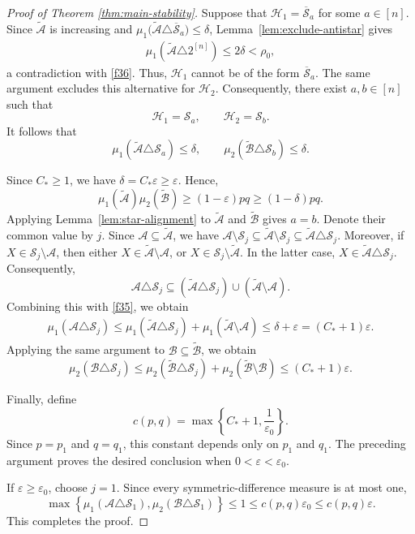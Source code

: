 \documentclass[11pt]{article}
\numberwithin{equation}{section}
\theoremstyle{definition}
\theoremstyle{remark}
\begin{document}
\begin{proof}[Proof of Theorem \ref{thm:main-stability}]
Suppose that
$
\mathcal H_1=\overline{\mathcal S}_a
$
for some $a\in[n]$. Since $\widetilde{\mathcal A}$ is increasing and $\mu_1\bigl(\widetilde{\mathcal A}\triangle
\overline{\mathcal S}_a\bigr)\leq \delta$,
Lemma~\ref{lem:exclude-antistar} gives
$$
\begin{aligned}
\mu_1(\widetilde{\mathcal A}\triangle2^{[n]})
\leq
2\delta<
\rho_0,
\end{aligned}
$$
a contradiction with \eqref{f36}.
Thus, $\mathcal H_1$ cannot be of the form
$\overline{\mathcal S}_a$. The same argument excludes this
alternative for $\mathcal H_2$. Consequently, there exist
$a,b\in[n]$ such that
$$
\mathcal H_1=\mathcal S_a,
\qquad
\mathcal H_2=\mathcal S_b.
$$
It follows that
$$
\mu_1(\widetilde{\mathcal A}\triangle\mathcal S_a)
\leq
\delta,
\qquad
\mu_2(\widetilde{\mathcal B}\triangle\mathcal S_b)
\leq
\delta.
$$

Since $C_*\geq1$, we have $\delta=C_*\varepsilon\geq\varepsilon$. Hence,
$$
\mu_1(\widetilde{\mathcal A})
\mu_2(\widetilde{\mathcal B})
\geq
(1-\varepsilon)pq
\geq
(1-\delta)pq.
$$
Applying Lemma~\ref{lem:star-alignment} to
$\widetilde{\mathcal A}$ and $\widetilde{\mathcal B}$  gives
$a=b$. Denote their common value by $j$.
Since $\mathcal A\subseteq\widetilde{\mathcal A}$, we have
$
\mathcal A\setminus\mathcal S_j
\subseteq
\widetilde{\mathcal A}\setminus\mathcal S_j
\subseteq
\widetilde{\mathcal A}\triangle\mathcal S_j.
$
Moreover, if
$X\in\mathcal S_j\setminus\mathcal A$, then either
$X\in\widetilde{\mathcal A}\setminus\mathcal A$, or
$X\in\mathcal S_j\setminus\widetilde{\mathcal A}$. In the latter
case,
$
X\in
\widetilde{\mathcal A}\triangle\mathcal S_j.
$
Consequently,
$$
\mathcal A\triangle\mathcal S_j
\subseteq
(\widetilde{\mathcal A}\triangle\mathcal S_j)
\cup
(\widetilde{\mathcal A}\setminus\mathcal A).
$$
Combining this with \eqref{f35}, we obtain
$$
\begin{aligned}
\mu_1(\mathcal A\triangle\mathcal S_j)
\leq
\mu_1(\widetilde{\mathcal A}\triangle\mathcal S_j)
+
\mu_1(\widetilde{\mathcal A}\setminus\mathcal A)\leq
\delta+\varepsilon=
(C_*+1)\varepsilon.
\end{aligned}
$$
Applying the same argument to
$\mathcal B\subseteq\widetilde{\mathcal B}$, we obtain
$$
\mu_2(\mathcal B\triangle\mathcal S_j)
\leq
\mu_2(\widetilde{\mathcal B}\triangle\mathcal S_j)
+
\mu_2(\widetilde{\mathcal B}\setminus\mathcal B)
\leq
(C_*+1)\varepsilon.
$$


Finally, define
$$
c(p,q)
=
\max\left\{
C_*+1,\frac{1}{\varepsilon_0}
\right\}.
$$
Since $p=p_1$ and $q=q_1$, this constant depends only on
$p_1$ and $q_1$. The preceding argument proves the desired
conclusion when $0<\varepsilon<\varepsilon_0$.

If $\varepsilon\geq\varepsilon_0$, choose $j=1$. Since every
symmetric-difference measure is at most one,
$$
\max\left\{
\mu_1(\mathcal A\triangle\mathcal S_1),
\mu_2(\mathcal B\triangle\mathcal S_1)
\right\}
\leq
1
\leq
c(p,q)\varepsilon_0\leq c(p,q)\varepsilon.
$$
This completes the proof.
\end{proof}
\end{document}
